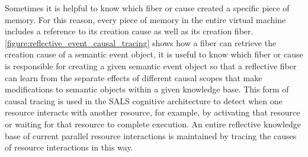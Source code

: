 Sometimes it is helpful to know which fiber or cause created a
specific piece of memory.  For this reason, every piece of memory in
the entire virtual machine includes a reference to its creation cause
as well as its creation fiber.
{\mbox{\autoref{figure:reflective_event_causal_tracing}}} shows how a
fiber can retrieve the creation cause of a semantic event object, it
is useful to know which fiber or cause is responsible for creating a
given semantic event object so that a reflective fiber can learn from
the separate effects of different causal scopes that make
modifications to semantic objects within a given knowledge base.  This
form of causal tracing is used in the SALS cognitive architecture to
detect when one resource interacts with another resource, for example,
by activating that resource or waiting for that resource to complete
execution.  An entire reflective knowledge base of current parallel
resource interactions is maintained by tracing the causes of resource
interactions in this way.
